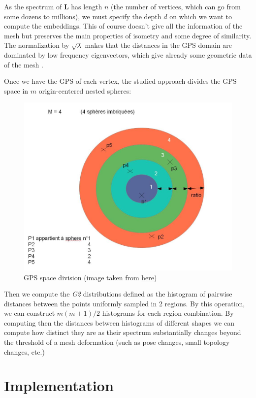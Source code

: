 \documentclass[conference]{IEEEtran}
\begin{document}
As the spectrum of $\mathbf{L}$ has length $n$ (the number of vertices, which can go from some dozens to millions), we must specify the depth $d$ on which we want to compute the embeddings. This of course doesn't give all the information of the mesh but preserves the main properties of isometry and some degree of similarity. The normalization by $\sqrt{\lambda}$ makes that the distances in the GPS domain are dominated by low frequency eigenvectors, which give already some geometric data of the mesh \cite{Reuter06}. 

Once we have the GPS of each vertex, the studied approach divides the GPS space in $m$ origin-centered nested spheres:

\begin{figure}[H]
    \centering
    \includegraphics[width=0.8\columnwidth]{Cercle_imbrique.jpg}
    \caption{GPS space division (image taken from \href{https://ensiwiki.ensimag.fr/index.php?title=Descripteur_de_formes_et_mouvements_3D_et_classification_d\%27animations}{here})}
    \label{fig:m_spheres}
\end{figure}

Then we compute the \emph{G2} distributions defined as the histogram of pairwise distances between the points uniformly sampled in 2 regions. By this operation, we can construct $m(m+1)/2$ histograms for each region combination. By computing then the distances between histograms of different shapes we can compute how distinct they are as their spectrum substantially changes beyond the threshold of a mesh deformation (such as pose changes, small topology changes, etc.)


\section{Implementation}
\end{document}
